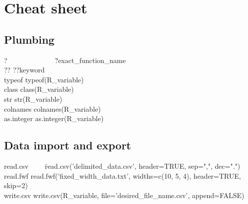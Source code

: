 \documentclass{report}
\begin{document}
\chapter{Cheat sheet}

	\section{Plumbing}
\begin{tabbing}
?~~~~~~~~~~~~~ \= ?exact\_function\_name \\
?? \> ??keyword \\
typeof \> typeof(R\_variable) \\
class \> class(R\_variable) \\
str \> str(R\_variable) \\
colnames \> colnames(R\_variable) \\
as.integer \> as.integer(R\_variable)
\end{tabbing}

	\section{Data import and export}
\begin{tabbing}
read.csv~~~~ \= read.csv('delimited\_data.csv', header=TRUE, sep=",", dec=".") \\
read.fwf \> read.fwf('fixed\_width\_data.txt', widths=c(10, 5, 4), header=TRUE, skip=2) \\
write.csv \> write.csv(R\_variable, file='desired\_file\_name.csv', append=FALSE)
\end{tabbing}

\printbibliography

\printnoidxglossaries
\end{document}
